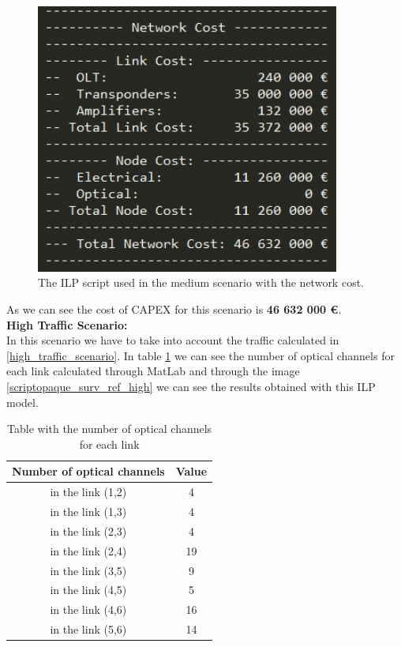 \begin{figure}[h!]
\centering
\includegraphics[width=10cm]{sdf/ilp/opaque_survivability/figures/script_opaque_surv_ref_medium}
\caption{The ILP script used in the medium scenario with the network cost.}
\label{scriptopaque_surv_ref_medium}
\end{figure}

As we can see the cost of CAPEX for this scenario is \textbf{46 632 000 \euro}.\\

\newpage
\textbf{High Traffic Scenario:}\\

In this scenario we have to take into account the traffic calculated in \ref{high_traffic_scenario}. In table \ref{result_ILP3_reference} we can see the number of optical channels for each link calculated through MatLab and through the image \ref{scriptopaque_surv_ref_high} we can see the results obtained with this ILP model.\\

\begin{table}[h!]
\centering
\begin{tabular}{|| c | c||}
 \hline
 Number of optical channels & Value \\
 \hline\hline
 in the link (1,2) & 4 \\
 in the link (1,3) & 4 \\
 in the link (2,3) & 4 \\
 in the link (2,4) & 19 \\
 in the link (3,5) & 9 \\
 in the link (4,5) & 5 \\
 in the link (4,6) & 16 \\
 in the link (5,6) & 14 \\
 \hline
\end{tabular}
\caption{Table with the number of optical channels for each link}
\label{result_ILP3_reference}
\end{table}


